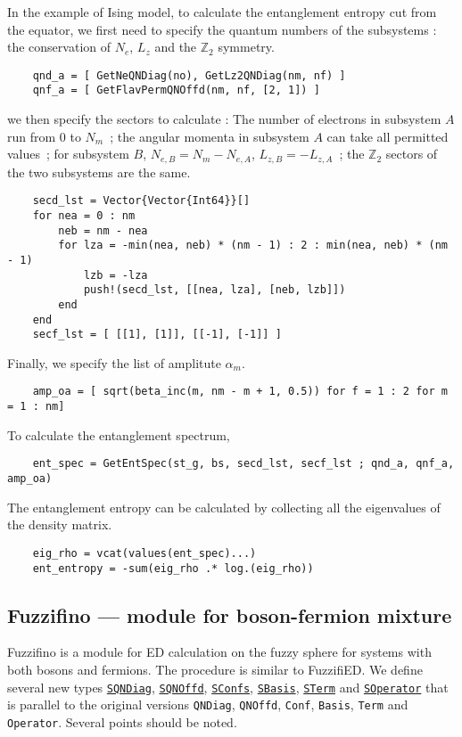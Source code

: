 \documentclass{timesjhep}
\begin{document}
In the example of Ising model, to calculate the entanglement entropy cut from the equator, we first need to specify the quantum numbers of the subsystems : the conservation of $N_e$, $L_z$ and the $\mathbb{Z}_2$ symmetry.
\begin{lstlisting}
    qnd_a = [ GetNeQNDiag(no), GetLz2QNDiag(nm, nf) ]
    qnf_a = [ GetFlavPermQNOffd(nm, nf, [2, 1]) ]
\end{lstlisting}
we then specify the sectors to calculate : The number of electrons in subsystem $A$ run from $0$ to $N_m$~; the angular momenta in subsystem $A$ can take all permitted values~; for subsystem $B$, $N_{e,B}=N_m-N_{e,A}$, $L_{z,B}=-L_{z,A}$~; the $\mathbb{Z}_2$ sectors of the two subsystems are the same. 
\begin{lstlisting}
    secd_lst = Vector{Vector{Int64}}[]
    for nea = 0 : nm 
        neb = nm - nea 
        for lza = -min(nea, neb) * (nm - 1) : 2 : min(nea, neb) * (nm - 1)
            lzb = -lza 
            push!(secd_lst, [[nea, lza], [neb, lzb]])
        end
    end
    secf_lst = [ [[1], [1]], [[-1], [-1]] ]
\end{lstlisting}
Finally, we specify the list of amplitute $\alpha_m$.
\begin{lstlisting}
    amp_oa = [ sqrt(beta_inc(m, nm - m + 1, 0.5)) for f = 1 : 2 for m = 1 : nm]
\end{lstlisting}
To calculate the entanglement spectrum, 
\begin{lstlisting}
    ent_spec = GetEntSpec(st_g, bs, secd_lst, secf_lst ; qnd_a, qnf_a, amp_oa)
\end{lstlisting}
The entanglement entropy can be calculated by collecting all the eigenvalues of the density matrix.
\begin{lstlisting}
    eig_rho = vcat(values(ent_spec)...)
    ent_entropy = -sum(eig_rho .* log.(eig_rho))
\end{lstlisting}

\subsection{Fuzzifino --- module for boson-fermion mixture}
\label{sec:ed_fuzzifino}

Fuzzifino is a module for ED calculation on the fuzzy sphere for systems with both bosons and fermions. The procedure is similar to FuzzifiED. We define several new types \href{https://docs.fuzzified.world/fuzzifino/\#FuzzifiED.Fuzzifino.SQNDiag}{\lstinline|SQNDiag|}, \href{https://docs.fuzzified.world/fuzzifino/\#FuzzifiED.Fuzzifino.SQNOffd}{\lstinline|SQNOffd|}, \href{https://docs.fuzzified.world/fuzzifino/\#FuzzifiED.Fuzzifino.SConfs}{\lstinline|SConfs|}, \href{https://docs.fuzzified.world/fuzzifino/\#FuzzifiED.Fuzzifino.SBasis}{\lstinline|SBasis|}, \href{https://docs.fuzzified.world/fuzzifino/\#FuzzifiED.Fuzzifino.STerm}{\lstinline|STerm|} and \href{https://docs.fuzzified.world/fuzzifino/\#FuzzifiED.Fuzzifino.SOperator}{\lstinline|SOperator|} that is parallel to the original versions \lstinline|QNDiag|, \lstinline|QNOffd|, \lstinline|Conf|, \lstinline|Basis|, \lstinline|Term| and \lstinline|Operator|. Several points should be noted.
\end{document}
